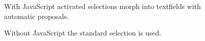 \begin{multicols}{2}

\begin{figure}[H]
%
\caption{With JavaScript activated selections morph into textfields with automatic proposals.}%
\end{figure}

\begin{figure}[H]
%
\caption{Without JavaScript the standard selection is used.}%
\end{figure}

\end{multicols}
